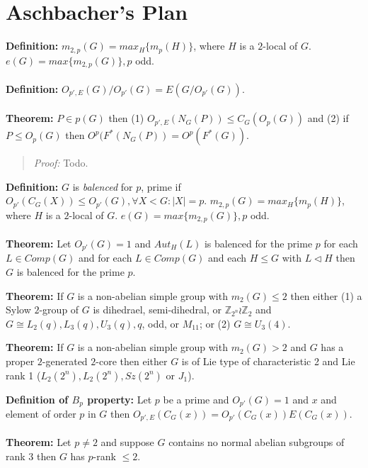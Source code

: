 \section{Aschbacher's Plan}
{\bf Definition:} 
$m_{2,p}(G)= max_H \{ m_p(H) \}$, where $H$ is a $2$-local of $G$.
$e(G)= max \{m_{2,p}(G) \}, p$ odd.
\\
\\
{\bf Definition:}
$O_{p', E}(G)/O_{p'}(G)= E(G/O_{p'}(G))$.
\\
\\
{\bf Theorem:} $P \in p(G)$ then 
(1) $O_{p', E}(N_G(P)) \le C_G(O_p(G))$ and
(2) if $P \le O_p(G)$ then $O^p(F^*(N_G(P))= O^p(F^*(G))$.
\begin{quote}
\emph{Proof:}  
Todo.
\end{quote}
{\bf Definition:} 
$G$ is \emph{balenced} for $p$, prime if $O_{p'}(C_G(X)) \le O_{p'}(G), \forall X < G: |X|=p$.
$m_{2,p}(G)= max_H \{ m_p(H) \}$, where $H$ is a $2$-local of $G$.
$e(G)= max \{m_{2,p}(G) \}, p$ odd.
\\
\\
{\bf Theorem:} Let $O_{p'}(G)=1$ and $Aut_H(L)$ is balenced for the prime $p$ 
for each $L \in Comp(G)$ and for each $L \in Comp(G)$ and each $H \le G$ with $L \lhd H$
then $G$ is balenced for the prime $p$.
\begin{quote}
\end{quote}
{\bf Theorem:} If $G$ is a non-abelian simple group with $m_2(G) \le 2$ then either
(1) a Sylow $2$-group of $G$ is dihedrael, semi-dihedral, or
${\mathbb Z}_{2^n} \wr {\mathbb Z}_2$ and $G \cong L_2(q), L_3(q), U_3(q), q$, odd, or
$M_{11}$; or (2) $G \cong U_3(4)$.
\begin{quote}
\end{quote}
{\bf Theorem:} If $G$ is a non-abelian simple group with $m_2(G) > 2$  and
$G$ has a proper $2$-generated $2$-core then either $G$ is of Lie type of characteristic 2
and Lie rank 1 ($L_2(2^n), L_2(2^n), Sz(2^n)$ or $J_1$).
\begin{quote}
\end{quote}
{\bf Definition of $B_p$ property:}   Let $p$ be a prime and $O_{p'}(G)=1$ and $x$ and element of
order $p$ in $G$ then $O_{p',E}(C_G(x))= O_{p'}(C_G(x))E(C_G(x))$.
\\
\\
{\bf Theorem:}
Let $p \ne 2$ and suppose $G$ contains no normal abelian subgroups of rank $3$ then
$G$ has $p$-rank $\le 2$.
\begin{quote}
\end{quote}
